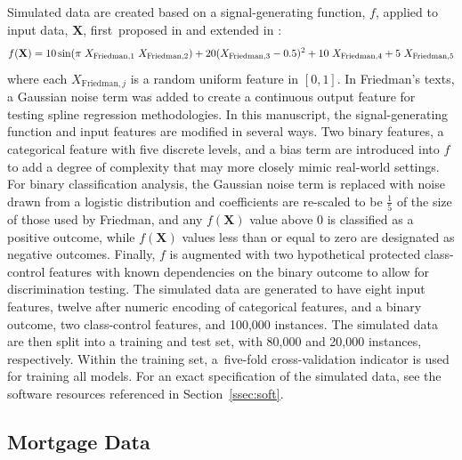 \documentclass[information,article,accept,moreauthors,pdftex]{Definitions/mdpi}
\begin{document}
Simulated data are created based on a signal-generating function, $f$, applied to input data, $\mathbf{X}$, first~proposed in \citet{friedman1979tree} and extended in \citet{friedman1991multivariate}:
\begin{equation}
\begin{aligned}\label{eq:sim}\small
f(\mathbf{X}) = 10\sin(\pi~X_{\text{Friedman},1}~X_{\text{Friedman},2}) + 20(X_{\text{Friedman},3} - 0.5)^2 + 10~X_{\text{Friedman},4} + 5~X_{\text{Friedman},5}
\end{aligned}
\end{equation}
where each $X_{\text{Friedman},j}$ is a random uniform feature in $[0,1]$. In Friedman's texts, a Gaussian noise term was added to create a continuous output feature for testing spline regression methodologies. In this manuscript, the signal-generating function and input features are modified in several ways.  Two binary features, a categorical feature with five discrete levels, and a bias term are introduced into $f$ to add a degree of complexity that may more closely mimic real-world settings. 
For binary classification analysis, the Gaussian noise term is replaced with noise drawn from a logistic distribution and coefficients are re-scaled to be $\frac{1}{5}$ of the size of those used by Friedman, and any $f(\mathbf{X})$ value above 0 is classified as a positive outcome, while $f(\mathbf{X})$ values less than or equal to zero are designated as negative outcomes.  Finally, $f$ is augmented with two hypothetical protected class-control features with known dependencies on the binary outcome to allow for discrimination testing. The simulated data are generated to have eight input features, twelve after numeric encoding of categorical features, and a binary outcome, two class-control features, and 100,000 instances. The simulated data are then split into a training and test set, with 80,000 and 20,000 instances, respectively.  Within the training set, a~five-fold cross-validation indicator is used for training all models. For an exact specification of the simulated data, see the software resources referenced in Section~\ref{ssec:soft}.


\subsection{Mortgage Data}\label{ssec:mort_data}
\end{document}
